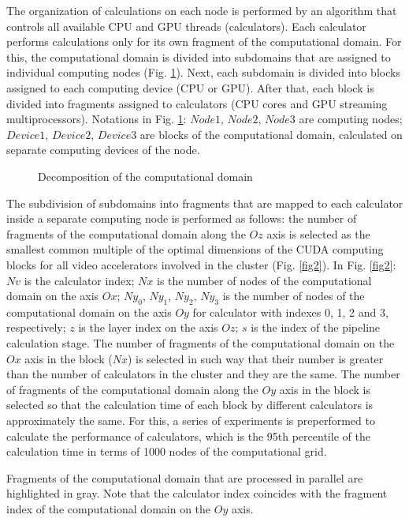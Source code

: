 \documentclass{svproc}
\begin{document}
The organization of calculations on each node is performed by an algorithm that controls all available CPU and GPU threads (calculators).
Each calculator performs calculations only for its own fragment of the computational domain.
For this, the computational domain is divided into subdomains that are assigned to individual computing nodes (Fig. \ref{fig1}).
Next, each subdomain is divided into blocks assigned to each computing device (CPU or GPU).
After that, each block is divided into fragments assigned to calculators (CPU cores and GPU streaming multiprocessors). 
Notations in Fig. \ref{fig1}: $Node1$, $Node2$, $Node3$ are computing nodes;
$Device1$, $Device2$, $Device3$ are blocks of the computational domain, calculated on separate computing devices of the node. 

\begin{figure}[h!]
	\caption{Decomposition of the computational domain} \label{fig1}
\end{figure}

The subdivision of subdomains into fragments that are mapped to each calculator inside a separate computing node is performed as follows: the number of fragments of the computational domain along the $Oz$ axis is selected as the smallest common multiple of the optimal dimensions of the CUDA computing blocks for all video accelerators involved in the cluster (Fig. \ref{fig2}).
In Fig. \ref{fig2}: $Nv$ is the calculator index; $Nx$ is the number of nodes of the computational domain on the axis $Ox$; $Ny_0$, $Ny_1$, $Ny_2$, $Ny_3$ is the number of nodes of the computational domain on the axis $Oy$ for calculator with indexes 0, 1, 2 and 3, respectively; $z$ is the layer index on the axis $Oz$; $s$ is the index of the pipeline calculation stage.
The number of fragments of the computational domain on the $Ox$ axis in the block ($Nx$) is selected in such way that their number is greater than the number of calculators in the cluster and they are the same. 
The number of fragments of the computational domain along the $Oy$ axis in the block is selected so that the calculation time of each block by different calculators is approximately the same. For this, a series of experiments is preperformed to calculate the performance of calculators, which is the 95th percentile of the calculation time in terms of 1000 nodes of the computational grid.

Fragments of the computational domain that are processed in parallel are highlighted in gray. Note that the calculator index coincides with the fragment index of the computational domain on the $Oy$ axis.
\end{document}
